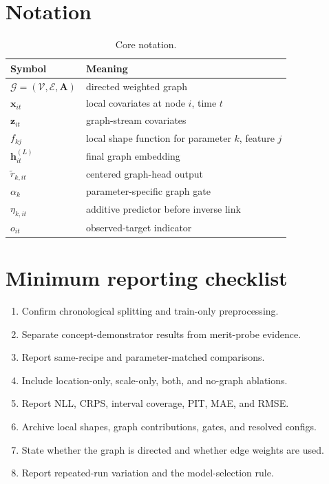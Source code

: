 \documentclass[11pt]{article}
\newcommand{\graph}{\mathcal{G}}
\begin{document}
\appendix

\section{Notation}

\begin{table}[h]
  \centering
  \caption{Core notation.}
  \begin{tabularx}{\linewidth}{lX}
    \toprule
    Symbol & Meaning\\
    \midrule
    $\graph=(\mathcal{V},\mathcal{E},\bm{A})$ & directed weighted graph\\
    $\bm{x}_{it}$ & local covariates at node $i$, time $t$\\
    $\bm{z}_{it}$ & graph-stream covariates\\
    $f_{kj}$ & local shape function for parameter $k$, feature $j$\\
    $\bm{h}^{(L)}_{it}$ & final graph embedding\\
    $\widetilde r_{k,it}$ & centered graph-head output\\
    $\alpha_k$ & parameter-specific graph gate\\
    $\eta_{k,it}$ & additive predictor before inverse link\\
    $o_{it}$ & observed-target indicator\\
    \bottomrule
  \end{tabularx}
\end{table}

\section{Minimum reporting checklist}

\begin{enumerate}
  \item Confirm chronological splitting and train-only preprocessing.
  \item Separate concept-demonstrator results from merit-probe evidence.
  \item Report same-recipe and parameter-matched comparisons.
  \item Include location-only, scale-only, both, and no-graph ablations.
  \item Report NLL, CRPS, interval coverage, PIT, MAE, and RMSE.
  \item Archive local shapes, graph contributions, gates, and resolved configs.
  \item State whether the graph is directed and whether edge weights are used.
  \item Report repeated-run variation and the model-selection rule.
\end{enumerate}
\end{document}
